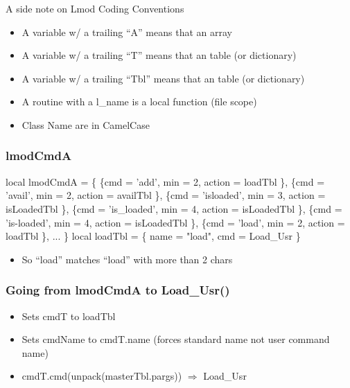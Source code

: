 \documentclass{beamer}
\begin{document}
\begin{frame}{A side note on Lmod Coding Conventions}
  \begin{itemize}
    \item A variable w/ a trailing ``A'' means that an array
    \item A variable w/ a trailing ``T'' means that an table (or dictionary)
    \item A variable w/ a trailing ``Tbl'' means that an table (or dictionary)
    \item A routine with a l\_name is a local function (file scope)
    \item Class Name are in CamelCase
  \end{itemize}
\end{frame}

\begin{frame}[fragile]
    \frametitle{lmodCmdA}
 {\tiny
   \begin{semiverbatim}
   local lmodCmdA = \{
      \{cmd = 'add',          min = 2, action = loadTbl     \},
      \{cmd = 'avail',        min = 2, action = availTbl    \},
      \{cmd = 'isloaded',     min = 3, action = isLoadedTbl \},
      \{cmd = 'is_loaded',    min = 4, action = isLoadedTbl \},
      \{cmd = 'is-loaded',    min = 4, action = isLoadedTbl \},
      \{cmd = 'load',         min = 2, action = loadTbl     \},
      ...
   \}
   local loadTbl      = \{ name = "load", cmd = Load_Usr    \}
    \end{semiverbatim}
  \begin{itemize}
    \item So ``load'' matches ``load'' with more than 2 chars
  \end{itemize}
}
\end{frame}

\begin{frame}[fragile]
    \frametitle{Going from lmodCmdA to Load\_Usr()}
  \begin{itemize}
    \item Sets cmdT to loadTbl
    \item Sets cmdName to cmdT.name (forces standard name not user
      command name)
    \item cmdT.cmd(unpack(masterTbl.pargs)) $\Rightarrow$ Load\_Usr
  \end{itemize}

\end{frame}
\end{document}

